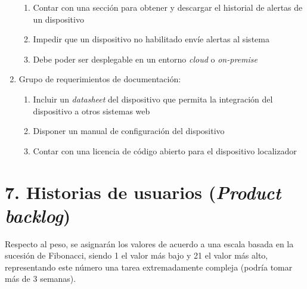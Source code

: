 \documentclass[
11pt, %
]{charter}
\begin{document}
\begin{enumerate}
\begin{enumerate}
	\item Contar con una sección para obtener y descargar el historial de alertas de un dispositivo
	\item Impedir que un dispositivo no habilitado envíe alertas al sistema
	\item Debe poder ser desplegable en un entorno \textit{cloud} o \textit{on-premise}
	\end{enumerate}
\item Grupo de requerimientos de documentación:
	\begin{enumerate}
	\item Incluir un \textit{datasheet} del dispositivo que permita la integración del dispositivo a otros sistemas web
	\item Disponer un manual de configuración del dispositivo
	\item Contar con una licencia de código abierto para el dispositivo localizador
	\end{enumerate}
\end{enumerate}

\section{7. Historias de usuarios (\textit{Product backlog})}
\label{sec:backlog}

Respecto al peso, se asignarán los valores de acuerdo a una escala basada en la sucesión de Fibonacci, siendo 1 el valor más bajo y 21 el valor más alto, representando este número una tarea extremadamente compleja (podría tomar más de 3 semanas).
\end{document}
